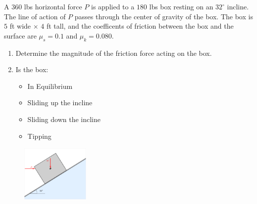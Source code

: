 
A $360$ lbs horizontal force $P$ is applied to a $180$ lbs box resting on an $32^\circ$ incline.  The line of action of $P$ passes through the center of gravity of the box.  The box is $5$ ft wide $\times$ $4$ ft tall, and the coefficents of friction between the box and the surface are $\mu_s = 0.1$ and $\mu_k = 0.080$.

\begin{enumerate}
  \item Determine the magnitude of the friction force acting on the box.
  \item Is the box:
    \begin{itemize}
      \item In Equilibrium
      \item Sliding up the incline
      \item Sliding down the incline
      \item Tipping
    \end{itemize}
\end{enumerate}

\begin{figure}[ht!]
  \centering
  \includegraphics[width=0.3\textwidth,height=0.5\textheight,keepaspectratio]{fig.png}
\end{figure}

